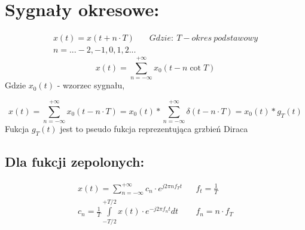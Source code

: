\section{Sygnały okresowe:}
    \begin{align*}
        x(t) = x(t+n\cdot T) && Gdzie:\ T- okres\ podstawowy\\
        n = ...-2, -1, 0, 1, 2...
    \end{align*}
    \begin{equation*}
        x(t) = \sum_{n = -\infty}^{+\infty}x_0(t-n\cot T)
    \end{equation*}
    Gdzie $x_0(t)$ - wzorzec sygnału,

    \begin{equation*}
        x(t) = \sum_{n=-\infty}^{+\infty}x_0(t-n\cdot T) = x_0(t) * \sum_{n=-\infty}^{+\infty}\delta(t-n\cdot T) = x_0(t)*g_T(t)
    \end{equation*}
    Fukcja $g_T(t)$ jest to pseudo fukcja reprezentująca grzbień Diraca

    \subsection*{Dla fukcji zepolonych:}
        \begin{align*}
            x(t) = \sum_{n=-\infty}^{+\infty} c_n \cdot e^{j2\pi n f_T t} && f_t = \frac{1}{T}\\
            c_n = \frac{1}{T} \int\limits_{-T/2}^{+T/2} x(t)\cdot e^{-j2\pi f_nt}dt && f_n = n\cdot f_T
        \end{align*}